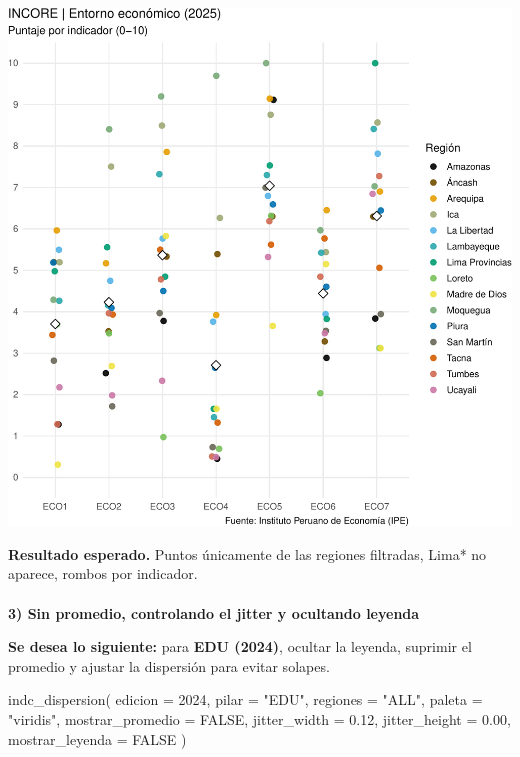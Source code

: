 \documentclass[
  11pt,
  letterpaper,
  DIV=11,
  numbers=noendperiod]{scrartcl}
\makeatletter
\let\oldparagraph\paragraph
\renewcommand{\paragraph}{
    \@ifstar
      \xxxParagraphStar
      \xxxParagraphNoStar
  }
\newcommand{\xxxParagraphStar}[1]{\oldparagraph*{#1}\mbox{}}
\newcommand{\xxxParagraphNoStar}[1]{\oldparagraph{#1}\mbox{}}
\newenvironment{Shaded}{\begin{snugshade}}{\end{snugshade}}
\newcommand{\AttributeTok}[1]{\textcolor[rgb]{0.40,0.45,0.13}{#1}}
\newcommand{\ConstantTok}[1]{\textcolor[rgb]{0.56,0.35,0.01}{#1}}
\newcommand{\DecValTok}[1]{\textcolor[rgb]{0.68,0.00,0.00}{#1}}
\newcommand{\FloatTok}[1]{\textcolor[rgb]{0.68,0.00,0.00}{#1}}
\newcommand{\FunctionTok}[1]{\textcolor[rgb]{0.28,0.35,0.67}{#1}}
\newcommand{\NormalTok}[1]{\textcolor[rgb]{0.00,0.23,0.31}{#1}}
\newcommand{\StringTok}[1]{\textcolor[rgb]{0.13,0.47,0.30}{#1}}
\makeatother
\begin{document}
\includegraphics{Manual_files/figure-pdf/unnamed-chunk-89-1.pdf}

\textbf{Resultado esperado.} Puntos únicamente de las regiones
filtradas, Lima* no aparece, rombos por indicador.

\paragraph{\texorpdfstring{\textbf{3) Sin promedio, controlando el
jitter y ocultando
leyenda}}{3) Sin promedio, controlando el jitter y ocultando leyenda}}\label{sin-promedio-controlando-el-jitter-y-ocultando-leyenda}

\textbf{Se desea lo siguiente:} para \textbf{EDU (2024)}, ocultar la
leyenda, suprimir el promedio y ajustar la dispersión para evitar
solapes.

\begin{Shaded}
\begin{Highlighting}[]
\FunctionTok{indc\_dispersion}\NormalTok{(}
  \AttributeTok{edicion          =} \DecValTok{2024}\NormalTok{,}
  \AttributeTok{pilar            =} \StringTok{"EDU"}\NormalTok{,}
  \AttributeTok{regiones         =} \StringTok{"ALL"}\NormalTok{,}
  \AttributeTok{paleta           =} \StringTok{"viridis"}\NormalTok{,}
  \AttributeTok{mostrar\_promedio =} \ConstantTok{FALSE}\NormalTok{,}
  \AttributeTok{jitter\_width     =} \FloatTok{0.12}\NormalTok{,}
  \AttributeTok{jitter\_height    =} \FloatTok{0.00}\NormalTok{,}
  \AttributeTok{mostrar\_leyenda  =} \ConstantTok{FALSE}
\NormalTok{)}
\end{Highlighting}
\end{Shaded}
\end{document}
